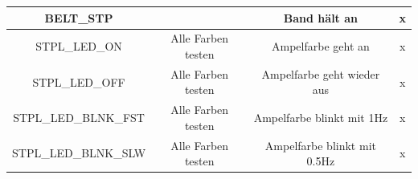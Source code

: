 \begin{table}[H]
{\begin{tabular}{|c|c|c|c|}
    BELT\_STP              &                    & Band hält an                & x         \\ \hline
    STPL\_LED\_ON          & Alle Farben testen & Ampelfarbe geht an          & x         \\ \hline
    STPL\_LED\_OFF         & Alle Farben testen & Ampelfarbe geht wieder aus  & x         \\ \hline
    STPL\_LED\_BLNK\_FST   & Alle Farben testen & Ampelfarbe blinkt mit 1Hz   & x         \\ \hline
    STPL\_LED\_BLNK\_SLW   & Alle Farben testen & Ampelfarbe blinkt mit 0.5Hz & x         \\ \hline
    \end{tabular}}
    \end{table}
